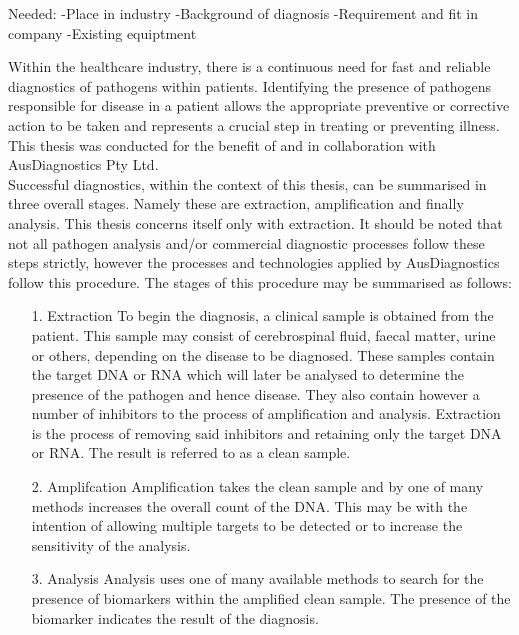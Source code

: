 Needed:
-Place in industry
-Background of diagnosis
-Requirement and fit in company
-Existing equiptment

Within the healthcare industry, there is a continuous need for fast and reliable diagnostics of pathogens within patients. Identifying the presence of pathogens responsible for disease in a patient allows the appropriate preventive or corrective action to be taken and represents a crucial step in treating or preventing illness. This thesis was conducted for the benefit of and in collaboration with AusDiagnostics Pty Ltd.\\

Successful diagnostics, within the context of this thesis, can be summarised in three overall stages. Namely these are extraction, amplification and finally analysis. This thesis concerns itself only with extraction. It should be noted that not all pathogen analysis and/or commercial diagnostic processes follow these steps strictly, however the processes and technologies applied by AusDiagnostics follow this procedure. The stages of this procedure may be summarised as follows:
\begin{enumerate}
	\item [1. Extraction] To begin the diagnosis, a clinical sample is obtained from the patient. This sample may consist of cerebrospinal fluid, faecal matter, urine or others, depending on the disease to be diagnosed. These samples contain the target DNA or RNA which will later be analysed to determine the presence of the pathogen and hence disease. They also contain however a number of inhibitors to the process of amplification and analysis. Extraction is the process of removing said inhibitors and retaining only the target DNA or RNA. The result is referred to as a clean sample.
	\item  [2. Amplifcation] Amplification takes the clean sample and by one of many methods increases the overall count of the DNA. This may be with the intention of allowing multiple targets to be detected or to increase the sensitivity of the analysis.
	\item[3. Analysis] Analysis uses one of many available methods to search for the presence of biomarkers within the amplified clean sample. The presence of the biomarker indicates the result of the diagnosis.
\end{enumerate}

